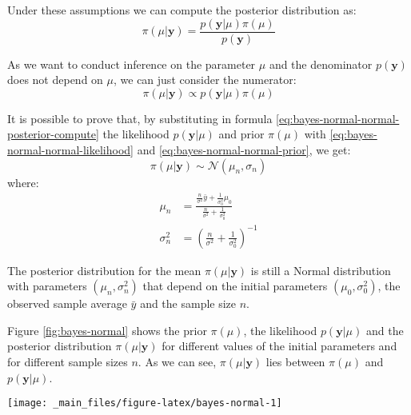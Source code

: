 \documentclass[a4paper, twoside, openright, 12pt]{report}
\let\origfigure\figure
\let\endorigfigure\endfigure
\renewenvironment{figure}[1][2] {
  \expandafter\origfigure\expandafter[!hbtp]
} {
  \endorigfigure
}
\theoremstyle{definition}
\theoremstyle{definition}
\theoremstyle{definition}
\theoremstyle{remark}
\begin{document}
Under these assumptions we can compute the posterior distribution as:
\[
\pi(\mu|\boldsymbol{y}) = \frac{p(\boldsymbol{y}|\mu)\pi(\mu)}{p(\boldsymbol{y})}
\]

As we want to conduct inference on the parameter \(\mu\) and the denominator \(p(\boldsymbol{y})\) does not depend on \(\mu\), we can just consider the numerator:
\begin{equation}
\label{eq:bayes-normal-normal-posterior-compute}
\pi(\mu|\boldsymbol{y}) \propto p(\boldsymbol{y}|\mu)\pi(\mu)
\end{equation}

It is possible to prove that, by substituting in formula \eqref{eq:bayes-normal-normal-posterior-compute} the likelihood \(p(\boldsymbol{y}|\mu)\) and prior \(\pi(\mu)\) with \eqref{eq:bayes-normal-normal-likelihood} and \eqref{eq:bayes-normal-normal-prior}, we get:
\begin{equation}
\label{eq:bayes-normal-normal-posterior-result}
\pi(\mu|\boldsymbol{y}) \sim \mathcal{N}\left(  \mu_n, \sigma_n \right)
\end{equation}
where:
\begin{align}
\label{eq:bayes-normal-normal-mu}
\mu_n & = \frac{\frac{n}{\sigma^2}\bar{y} + \frac{1}{\sigma_0^2}\mu_0}{ \frac{n}{\sigma^2} + \frac{1}{\sigma_0^2}} \\
\label{eq:bayes-normal-normal-sigma}
\sigma_n^2 & = \left( \frac{n}{\sigma^2} + \frac{1}{\sigma_0^2} \right)^{-1}
\end{align}

The posterior distribution for the mean \(\pi(\mu|\boldsymbol{y})\) is still a Normal distribution with parameters \((\mu_n, \sigma_n^2)\) that depend on the initial parameters \((\mu_0, \sigma_0^2)\), the observed sample average \(\bar{y}\) and the sample size \(n\).

Figure \ref{fig:bayes-normal} shows the prior \(\pi(\mu)\), the likelihood \(p(\boldsymbol{y}|\mu)\) and the posterior distribution \(\pi(\mu|\boldsymbol{y})\) for different values of the initial parameters and for different sample sizes \(n\). As we can see, \(\pi(\mu|\boldsymbol{y})\) lies between \(\pi(\mu)\) and \(p(\boldsymbol{y}|\mu)\).





\begin{figure}[!hbtp]

{\centering \texttt{[image: \_main\_files/figure-latex/bayes-normal-1]} 

}

\caption[Prior \(\pi(\mu)\), likelihood \(p(\boldsymbol{y}|\mu)\) and posterior distribution \(\pi(\mu|\boldsymbol{y})\) for the estimate of the mean from a Normal distribution.]{Prior \(\pi(\mu)\), likelihood \(p(\boldsymbol{y}|\mu)\) and posterior distribution \(\pi(\mu|\boldsymbol{y})\) for the estimate of the mean from a Normal distribution. The panels shows \(\pi(\mu)\), \(p(\boldsymbol{y}|\mu)\) and \(\pi(\mu|\boldsymbol{y})\) for different values of the prior variance \(\sigma_0\) (rows) and different sample sizes \(n\) (columns).}\label{fig:bayes-normal}
\end{figure}
\end{document}
